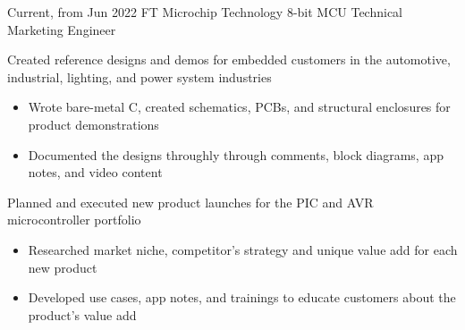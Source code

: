 \documentclass[
	10pt, %
]{FreemanCV}
\begin{document}
\jobentry
	{Current, from Jun 2022} %
	{FT} %
	{Microchip Technology} %
	{8-bit MCU Technical Marketing Engineer} %
	{ %
		\item Created reference designs and demos for embedded customers in the automotive, industrial, lighting, and power system industries
		\begin{itemize}[topsep=-10pt]
			\itemsep-5pt
			\item Wrote bare-metal C, created schematics, PCBs, and structural enclosures for product demonstrations
			\item Documented the designs throughly through comments, block diagrams, app notes, and video content
		\end{itemize}

		\item Planned and executed new product launches for the PIC and AVR microcontroller portfolio
		\begin{itemize}[topsep=-10pt]
			\itemsep-5pt
			\item Researched market niche, competitor's strategy and unique value add for each new product
			\item Developed use cases, app notes, and trainings to educate customers about the product's value add
		\end{itemize}

	} 
\end{document}
